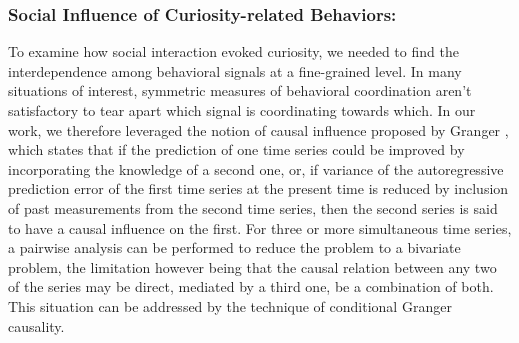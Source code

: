 \documentclass{llncs}
\begin{document}
\subsubsection{Social Influence of Curiosity-related Behaviors:}
\vspace{-0.26cm}
To examine how social interaction evoked curiosity, we needed to find the interdependence among behavioral signals at a fine-grained level. In many situations of interest, symmetric measures of behavioral coordination aren’t satisfactory to tear apart which signal is coordinating towards which. In our work, we therefore leveraged the notion of causal influence proposed by Granger \cite{ding200617}, which states that if the prediction of one time series could be improved by incorporating the knowledge of a second one, or, if variance of the autoregressive prediction error of the first time series at the present time is reduced by inclusion of past measurements from the second time series, then the second series is said to have a causal influence on the first. For three or more simultaneous time series, a pairwise analysis can be performed to reduce the problem to a bivariate problem, the limitation however being that the causal relation between any two of the series may be direct, mediated by a third one, be a combination of both. This situation can be addressed by the technique of conditional Granger causality. 
\end{document}
